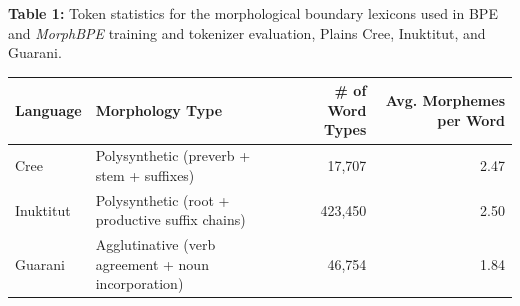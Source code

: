 \documentclass{standalone}
\begin{document}
\begin{minipage}{13cm}
{\bfseries Table 1:} Token statistics for the morphological boundary lexicons used in BPE and \textit{MorphBPE} training and tokenizer evaluation, Plains Cree, Inuktitut, and Guarani.

\vspace{0.5em}
\begin{tabular}{llrr}
\toprule
Language & Morphology Type & \# of Word Types & Avg. Morphemes per Word \\
\midrule
Cree      & Polysynthetic (preverb + stem + suffixes)        & 17{,}707  & 2.47 \\
Inuktitut & Polysynthetic (root + productive suffix chains)  & 423{,}450 & 2.50 \\
Guarani   & Agglutinative (verb agreement + noun incorporation) & 46{,}754 & 1.84 \\
\bottomrule
\end{tabular}
\end{minipage}
\end{document}
